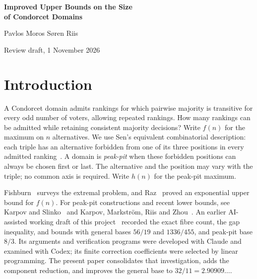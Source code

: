 \documentclass[11pt,letterpaper]{article}
\theoremstyle{definition}
\begin{document}
\begin{center}
{\Large\bfseries Improved Upper Bounds on the Size\\[2pt]
of Condorcet Domains}\par
\medskip
Pavlos Moros \qquad S\o ren Riis\par
\small Review draft, 1 November 2026
\end{center}
\begin{abstract}
We prove \(f(n)\leq32n f(n-1)/(11n+8)\) for the maximum size of a
Condorcet domain, giving exponential base \(32/11<3\).
An exact deletion count, a decomposition into adjacent-swap components
and a local counting inequality give the bound; the same local
inequality gives base \(8/3\) for peak-pit domains.
Small examples illustrate the structural counts. The mathematical
argument is presented here; the exact finite calculations, reproducible
programs and complete Lean formalisation are supplied as accompanying
computational material.
\end{abstract}

\section{Introduction}\label{sec:introduction}
A Condorcet domain admits rankings for which pairwise majority is
transitive for every odd number of voters, allowing repeated rankings.
How many rankings can be admitted while retaining consistent majority
decisions? Write \(f(n)\) for the maximum on \(n\) alternatives.
We use Sen's equivalent combinatorial description: each triple has
an alternative forbidden from one of its three positions in every
admitted ranking~\cite{Sen}. A domain is \emph{peak-pit} when these
forbidden positions can always be chosen first or last. The alternative
and the position may vary with the triple; no common axis is required.
Write \(h(n)\) for the peak-pit maximum.

Fishburn~\cite{Fishburn} surveys the extremal problem, and
Raz~\cite{Raz} proved an exponential upper bound for \(f(n)\).
For peak-pit constructions and recent lower bounds, see Karpov and
Slinko~\cite{KarpovSlinko} and Karpov, Markstr\"om, Riis and
Zhou~\cite{KMRZ}. An earlier AI-assisted working draft of this
project~\cite{Moros} recorded the exact fibre count, the gap inequality,
and bounds with general bases \(56/19\) and \(1336/455\), and peak-pit
base \(8/3\). Its arguments and verification programs were developed
with Claude and examined with Codex; its finite correction coefficients
were selected by linear programming. The present paper consolidates
that investigation, adds the component reduction, and improves the
general base to \(32/11=2.90909\ldots\).
\end{document}
